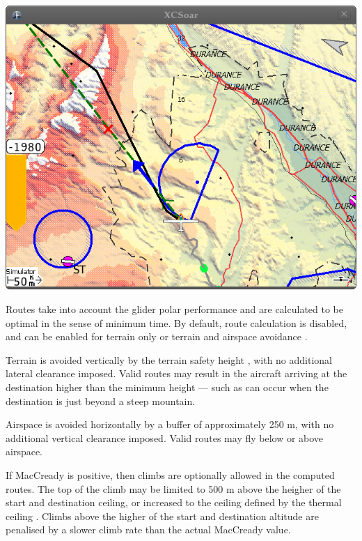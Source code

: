 \begin{center}
\includegraphics[angle=0,width=1.0\linewidth,keepaspectratio='true']{figures/route3.png}
\end{center}

Routes take into account the glider polar performance and are
calculated to be optimal in the sense of minimum time.  By default,
route calculation is disabled, and can be enabled for terrain only or
terrain and airspace avoidance .

Terrain is avoided vertically by the terrain safety height
, with no additional lateral clearance imposed.
Valid routes may result in the aircraft arriving at the destination
higher than the minimum height --- such as can occur when the
destination is just beyond a steep mountain.

Airspace is avoided horizontally by a buffer of approximately 250 m,
with no additional vertical clearance imposed.  Valid routes may fly
below or above airspace.

If MacCready is positive, then climbs are optionally allowed
 in the computed routes.  The top of the climb
may be limited to 500 m above the heigher of the start and destination
ceiling, or increased to the ceiling defined by the thermal ceiling
.  Climbs above the higher of the start and
destination altitude are penalised by a slower climb rate than the
actual MacCready value.

